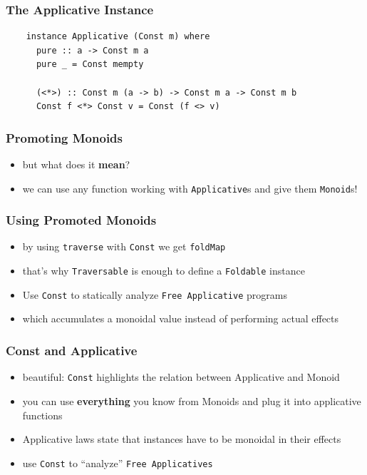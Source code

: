 \documentclass[aspectratio=169]{beamer}
\begin{document}
\begin{frame}[fragile]
  \frametitle{The Applicative Instance}
  \begin{verbatim}
    instance Applicative (Const m) where
      pure :: a -> Const m a
      pure _ = Const mempty

      (<*>) :: Const m (a -> b) -> Const m a -> Const m b
      Const f <*> Const v = Const (f <> v)
  \end{verbatim}
\end{frame}

\begin{frame}
  \frametitle{Promoting Monoids}
  \begin{itemize}
  \item but what does it \textbf{mean}?
  \item we can use any function working with \texttt{Applicative}s and
    give them \texttt{Monoid}s!
  \end{itemize}
\end{frame}

\begin{frame}
  \frametitle{Using Promoted Monoids}
  \begin{itemize}
  \item by using \texttt{traverse} with \texttt{Const} we get \texttt{foldMap}
  \item that's why \texttt{Traversable} is enough to define a \texttt{Foldable} instance
  \item Use \texttt{Const} to statically analyze \texttt{Free Applicative} programs
  \item which accumulates a monoidal value instead of performing actual effects
  \end{itemize}
\end{frame}

\begin{frame}
  \frametitle{Const and Applicative}
  \begin{itemize}
  \item beautiful: \texttt{Const} highlights the relation between
    Applicative and Monoid
  \item you can use \textbf{everything} you know from Monoids and plug it into applicative functions
  \item Applicative laws state that instances have to be monoidal in
    their effects
  \item use \texttt{Const} to ``analyze'' \texttt{Free Applicatives}
  \end{itemize}
\end{frame}
\end{document}

